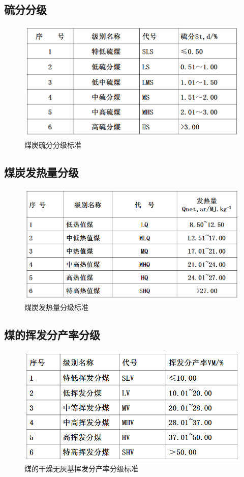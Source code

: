 \documentclass[10pt,openany]{ctexbook}
\begin{document}
\subsection{硫分分级}
 \begin{figure}[!ht]
\includegraphics[scale=0.67]{8}
\caption{煤炭硫分分级标准}
\end{figure}
\subsection{煤炭发热量分级 }
 \begin{figure}[!ht]
\includegraphics[scale=0.65]{9}
\caption{煤炭发热量分级标准}
\end{figure}
\subsection{煤的挥发分产率分级 }
 \begin{figure}[!ht]
\includegraphics[scale=0.736]{10}
\caption{煤的干燥无灰基挥发分产率分级标准}
\end{figure}
\end{document}

